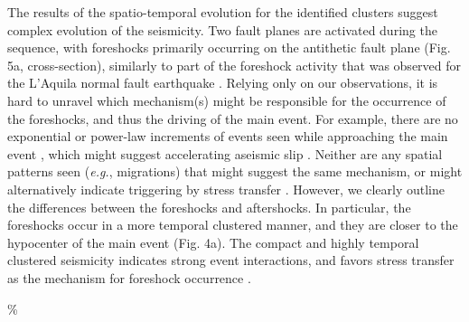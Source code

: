 \documentclass[a4paper,12pt,twoside]{article}
\begin{document}
The results of the spatio-temporal evolution for the identified clusters suggest complex evolution of the seismicity. Two fault planes are activated during the sequence, with foreshocks primarily occurring on the antithetic fault plane (Fig. 5a, cross-section), similarly to part of the foreshock activity that was observed for the L'Aquila normal fault earthquake \citep{Chiaraluce_2011_AAN}. Relying only on our observations, it is hard to unravel which mechanism(s) might be responsible for the occurrence of the foreshocks, and thus the driving of the main event. For example, there are no exponential or power-law increments of events seen while approaching the main event \citep{Papazachos_1975_FEP,Kagan_1978_SSO}, which might suggest accelerating aseismic slip \citep{Dodge_1996_DOC, Bouchon_2011_ENI, Tape_2018_ENF}. Neither are any spatial patterns seen (\emph{e.g.}, migrations) that might suggest the same mechanism, or might alternatively indicate triggering by stress transfer \citep{Dodge_1996_DOC, Ellsworth_2018_NIE, Yoon_2019_FMN}. However, we clearly outline the differences between the foreshocks and aftershocks. In particular, the foreshocks occur in a more temporal clustered manner, and they are closer to the hypocenter of the main event (Fig. 4a). The compact and highly temporal clustered seismicity indicates strong event interactions, and favors stress transfer as the mechanism for foreshock occurrence \citep[COV,][]{Schoenball_2017_SAS}.

\protect{}\%\protect{}\citep{uchida2019,uchida2019repeating}\protect{}
\end{document}
